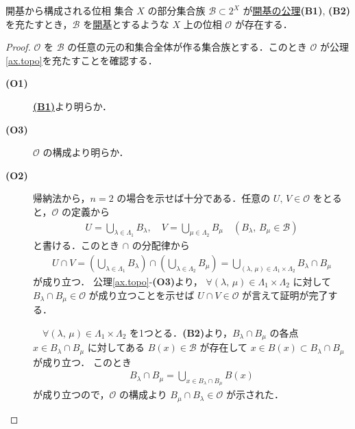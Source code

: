\documentclass[geometry_main]{subfiles}
\begin{document}
\begin{mytheo}[label=thm.optotopo]{開基から構成される位相}
	集合 $X$ の部分集合族 $\mathscr{B} \subset 2^X$ が\hyperref[ax.opbase]{開基の公理}\textsf{\textbf{(B1)}}, \textsf{\textbf{(B2)}}を充たすとき，$\mathscr{B}$ を\hyperref[def.opbase]{開基}とするような $X$ 上の位相 $\mathscr{O}$ が存在する．
\end{mytheo}
\begin{proof}
	$\mathscr{O}$ を $\mathscr{B}$ の任意の元の和集合全体が作る集合族とする．このとき $\mathscr{O}$ が公理\ref{ax.topo}を充たすことを確認する．
	\begin{description}
		\item[\textbf{(O1)}] \hyperref[ax.opbase]{\textsf{\textbf{(B1)}}}より明らか．
		\item[\textbf{(O3)}] $\mathscr{O}$ の構成より明らか．
		\item[\textbf{(O2)}] 帰納法から，$n=2$ の場合を示せば十分である．任意の $U,\, V \in \mathscr{O}$ をとると，$\mathscr{O}$ の定義から
		\begin{align}
			U = \bigcup_{\lambda \in \Lambda_1} B_\lambda,\quad V = \bigcup_{\mu \in \Lambda_2} B_\mu \quad (B_\lambda,\, B_\mu \in \mathscr{B})
		\end{align}
		と書ける．このとき $\cap$ の分配律から
		\begin{align}
			U \cap V = \left(\bigcup_{\lambda \in \Lambda_1} B_\lambda \right) \cap \left(\bigcup_{\lambda \in \Lambda_2} B_\mu\right) = \bigcup_{(\lambda,\, \mu) \in \Lambda_1 \times \Lambda_2} B_\lambda \cap B_\mu
		\end{align}
		が成り立つ．
		公理\ref{ax.topo}-\textsf{\textbf{(O3)}}より，
		$\forall (\lambda,\, \mu) \in \Lambda_1 \times \Lambda_2$ に対して $B_\lambda \cap B_\mu \in \mathscr{O}$ が成り立つことを示せば $U \cap V \in \mathscr{O}$ が言えて証明が完了する．

		　$\forall (\lambda,\, \mu) \in \Lambda_1 \times \Lambda_2$ を1つとる．\textsf{\textbf{(B2)}}より，$B_\lambda \cap B_\mu$ の各点 $x \in B_{\lambda} \cap B_{\mu}$ に対してある $B(x) \in \mathscr{B}$ が存在して $x \in B(x) \subset B_\lambda \cap B_\mu$ が成り立つ．
		このとき
		\begin{align}
			B_\lambda \cap B_\mu = \bigcup_{x \in B_\lambda\cap B_\mu} B(x)
		\end{align}
		が成り立つので，$\mathscr{O}$ の構成より $B_\mu \cap B_\lambda \in \mathscr{O}$ が示された．
	\end{description}
\end{proof}
\end{document}
